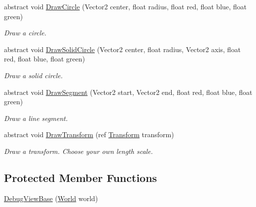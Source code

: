 \begin{DoxyCompactItemize}
abstract void \hyperlink{class_farseer_physics_1_1_debug_view_base_a8d3ba26bbbfa8a445bb6cb01df4a08f8}{Draw\+Circle} (Vector2 center, float radius, float red, float blue, float green)
\begin{DoxyCompactList}\small\item\em Draw a circle. \end{DoxyCompactList}\item 
abstract void \hyperlink{class_farseer_physics_1_1_debug_view_base_a30f0bf0bb90e97cdd5be695b30f94a48}{Draw\+Solid\+Circle} (Vector2 center, float radius, Vector2 axis, float red, float blue, float green)
\begin{DoxyCompactList}\small\item\em Draw a solid circle. \end{DoxyCompactList}\item 
abstract void \hyperlink{class_farseer_physics_1_1_debug_view_base_a407e1d6d318b6295e409e5075e7c3127}{Draw\+Segment} (Vector2 start, Vector2 end, float red, float blue, float green)
\begin{DoxyCompactList}\small\item\em Draw a line segment. \end{DoxyCompactList}\item 
abstract void \hyperlink{class_farseer_physics_1_1_debug_view_base_af3fa45abad1dc7eaf0bdb665c3a521f7}{Draw\+Transform} (ref \hyperlink{struct_farseer_physics_1_1_common_1_1_transform}{Transform} transform)
\begin{DoxyCompactList}\small\item\em Draw a transform. Choose your own length scale. \end{DoxyCompactList}\end{DoxyCompactItemize}
\subsection*{Protected Member Functions}
\begin{DoxyCompactItemize}
\item 
\hyperlink{class_farseer_physics_1_1_debug_view_base_ae424baf585fa71975fcc3bc3ec77397a}{Debug\+View\+Base} (\hyperlink{class_farseer_physics_1_1_dynamics_1_1_world}{World} world)
\end{DoxyCompactItemize}
